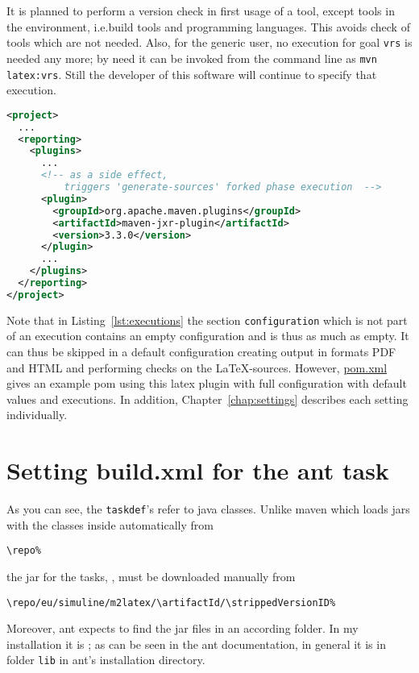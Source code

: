 It is planned to perform a version check in first usage of a tool, 
except tools in the environment, i.e.\@ build tools and programming languages. 
This avoids check of tools which are not needed. 
Also, for the generic user, no execution for goal \texttt{vrs} is needed any more; 
by need it can be invoked from the command line as \texttt{mvn latex:vrs}. 
Still the developer of this software will continue to specify that execution. 



\begin{lstlisting}[language=XML, basicstyle=\footnotesize,
escapechar=|,
float, captionpos=hb, label={lst:forkJxr}, 
caption={Forked execution with jxr plugin}]
<project>
  ...
  <reporting>
    <plugins>
      ...
      <!-- as a side effect, 
          triggers 'generate-sources' forked phase execution  -->
      <plugin>
        <groupId>org.apache.maven.plugins</groupId>
        <artifactId>maven-jxr-plugin</artifactId>
        <version>3.3.0</version>
      </plugin>
      ...
    </plugins>
  </reporting>
</project>
\end{lstlisting}

Note that in Listing~\ref{lst:executions} 
the section \texttt{configuration} which is not part of an execution 
contains an empty configuration and is thus as much as empty. 
It can thus be skipped in a default configuration
creating output in formats PDF and HTML and performing checks on the \LaTeX-sources. 
However, \href{\urlSite fromMain/pom4pdf.xml}{pom.xml} 
gives an example pom using this latex plugin 
with full configuration with default values and executions.
In addition, Chapter~\ref{chap:settings} describes each setting individually. 
\medskip



\section{Setting build.xml for the ant task}\label{sec:xmlBuild}

As you can see, the \texttt{taskdef}'s refer to java classes.
Unlike maven which loads jars with the classes inside automatically
from
% 
\begin{Verbatim}[fontsize=\small, commandchars=\\\{\}]
\repo%
\end{Verbatim}
%
the jar for the tasks, \createdJar,
must be downloaded manually from
%
\begin{Verbatim}[fontsize=\scriptsize, commandchars=\\\{\}]
\repo/eu/simuline/m2latex/\artifactId/\strippedVersionID%
\end{Verbatim}
%
Moreover, ant expects to find the jar files in an according folder.
In my installation it is \antJarDir;
as can be seen in the ant documentation,
in general it is in folder \texttt{lib} in ant's installation directory. 

